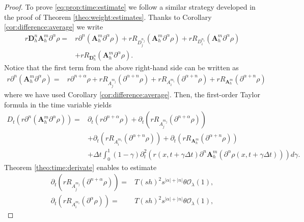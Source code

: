 \documentclass[11pt,oneside,leqno]{amsart}
\numberwithin{equation}{section}
\numberwithin{equation}{section}
\begin{document}
\begin{proof}
   To prove \eqref{eq:prop:time:estimate} we follow a similar strategy developed in the proof of Theorem \ref{theo:weight:estimates}. Thanks to Corollary \ref{cor:difference:average} we write
\begin{equation}\label{estimate:theo:fully}
\begin{aligned}
    r\mathbf{D}_{h}^{n}\mathbf{A}_{h}^{m}\partial^{\alpha}\rho=& r\partial^{n}(\mathbf{A}_{h}^{m}\partial^{\alpha}\rho)+rR_{D^{n_{j}}_{j}}(\mathbf{A}_{h}^{m}\partial^{\alpha}\rho)+rR_{D^{n_{i
}}_{i}}(\mathbf{A}_{h}^{m}\partial^{\alpha}\rho)\\
&+rR_{\mathbf{D}_{h}^{n}}(\mathbf{A}_{h}^{m}\partial^{\alpha}\rho).
    \end{aligned}
\end{equation}
Notice that the first term from the above right-hand side can be written as
\begin{align*}
r\partial^{n}(\mathbf{A}_{h}^{m}\partial^{\alpha}\rho)=&r\partial^{n+\alpha}\rho+rR_{A_{j}^{m_{j}}}(\partial^{\alpha+n}\rho)+rR_{A_{i}^{m_{i}}}(\partial^{\alpha+n}\rho)+rR_{\mathbf{A}_{h}^{m}}(\partial^{\alpha+n}\rho)
\end{align*}
where we have used Corollary \ref{cor:difference:average}.
Then, the first-order Taylor formula in the time variable yields
\begin{equation}\label{eq:almost:estimate}
\begin{aligned}
    D_{t}(r\partial^{n}(\mathbf{A}_{h}^{m}\partial^{\alpha}\rho))=&\partial_{t}(r\partial^{n+\alpha}\rho)+\partial_{t}(rR_{A_{j}^{m_{j}}}(\partial^{n+\alpha}\rho))\\
    &+\partial_{t}(rR_{A_{i}^{m_{i}}}(\partial^{\alpha+n}\rho))+\partial_{t}(rR_{\mathbf{A}_{h}^{m}}(\partial^{\alpha+n}\rho))\\
    &+\Delta t\int_{0}^{1}(1-\gamma)\partial_{t}^{2}\left( r(x,t+\gamma\Delta t)\partial^{n}\mathbf{A}_{h}^{m}(\partial^{\alpha}\rho(x,t+\gamma\Delta t))\right)d\gamma.
    \end{aligned}
\end{equation}
Theorem \ref{theo:time:derivate} enables to estimate
\begin{equation}\label{eq:estimate:R}
\begin{aligned}
\partial_{t}(rR_{A_{j}^{m_{j}}}(\partial^{n+\alpha}\rho))=&T(sh)^{2}s^{|\alpha|+|n|}\theta\mathcal{O}_{\lambda}(1),\\ \partial_{t}(rR_{A_{i}^{m_{i}}}(\partial^{\alpha}\rho))=&T(sh)^{2}s^{|\alpha|+|n|}\theta\mathcal{O}_{\lambda}(1),

\end{aligned}
\end{equation}
\end{proof}
\end{document}
